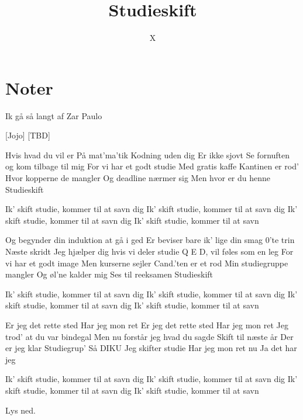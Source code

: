 \documentclass{article}
\title{Studieskift}
\author{X}
\begin{document}
                
\maketitle
\section*{Noter}  
Ik gå så langt af Zar Paulo%
\begin{roles}
 [Jojo] 
 [TBD]
\end{roles}

\begin{props}

\prop{} 
\end{props}

\newpage%
\begin{song}


Hvis hvad du vil er 
På mat’ma’tik
Kodning uden dig
Er ikke sjovt
Se fornuften og kom tilbage til mig
For vi har et godt studie
Med gratis kaffe
Kantinen er rod’
Hvor kopperne de mangler
Og deadline nærmer sig
Men hvor er du henne
Studieskift

Ik’ skift studie, kommer til at savn dig
Ik’ skift studie, kommer til at savn dig
Ik’ skift studie, kommer til at savn dig
Ik’ skift studie, kommer til at savn

Og begynder din induktion at gå i ged
Er beviser bare ik’ lige din smag
0’te trin
Næste skridt
Jeg hjælper dig hvis vi deler studie
Q E D, vil føles som en leg
For vi har et godt image
Men kurserne sejler
Cand.’ten er et rod
Min studiegruppe mangler
Og øl’ne kalder mig
Ses til reeksamen
Studieskift 

Ik’ skift studie, kommer til at savn dig
Ik’ skift studie, kommer til at savn dig
Ik’ skift studie, kommer til at savn dig
Ik’ skift studie, kommer til at savn

Er jeg det rette sted
Har jeg mon ret
Er jeg det rette sted
Har jeg mon ret
Jeg trod’ at du var bindegal
Men nu forstår jeg hvad du sagde
Skift til næste år
Der er jeg klar
Studiegrup’
Så DIKU
Jeg skifter studie
Har jeg mon ret nu
Ja det har jeg

Ik’ skift studie, kommer til at savn dig
Ik’ skift studie, kommer til at savn dig
Ik’ skift studie, kommer til at savn dig
Ik’ skift studie, kommer til at savn





\scene Lys ned.

\end{song}
\end{document}
